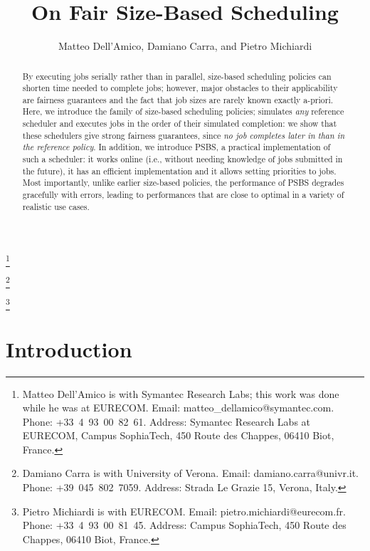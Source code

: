 \documentclass[11pt,oneside,english]{amsart}
\numberwithin{equation}{section}
\numberwithin{figure}{section}
\theoremstyle{definition}
\theoremstyle{plain}
\begin{document}
\title{On Fair Size-Based Scheduling}


\author{Matteo Dell'Amico, Damiano Carra, and Pietro Michiardi}

\begin{abstract}
By executing jobs serially rather than in parallel, size-based
scheduling policies can shorten time needed to complete jobs; however,
major obstacles to their applicability are fairness guarantees and the
fact that job sizes are rarely known exactly a-priori. Here, we
introduce the  family of size-based scheduling policies;
 simulates \emph{any} reference scheduler and executes
jobs in the order of their simulated completion: we show that these
schedulers give strong fairness guarantees, since \emph{no job
  completes later in  than in the reference policy}. In
addition, we introduce PSBS, a practical implementation of such a
scheduler: it works online (i.e., without needing knowledge of jobs submitted
in the future), it has an efficient  implementation and it
allows setting priorities to jobs. Most importantly, unlike earlier
size-based policies, the performance of PSBS degrades gracefully with
errors, leading to performances that are close to optimal in a variety
of realistic use cases.
\end{abstract}


\thanks{Matteo Dell'Amico is with Symantec Research Labs; this work
  was done while he was at EURECOM. Email:
  matteo\_dellamico@symantec.com. Phone: +33~4~93~00~82~61. Address:
  Symantec Research Labs at EURECOM, Campus SophiaTech, 450 Route des
  Chappes, 06410 Biot, France.}

\thanks{Damiano Carra is with University of Verona.  Email:
  damiano.carra@univr.it. Phone: +39~045~802~7059. Address: Strada Le
  Grazie 15, Verona, Italy.}

\thanks{Pietro Michiardi is with EURECOM. Email:
  pietro.michiardi@eurecom.fr. Phone: +33~4~93~00~81~45. Address:
  Campus SophiaTech, 450 Route des Chappes, 06410 Biot, France.}

\maketitle

\newpage

\section{Introduction}
\end{document}
